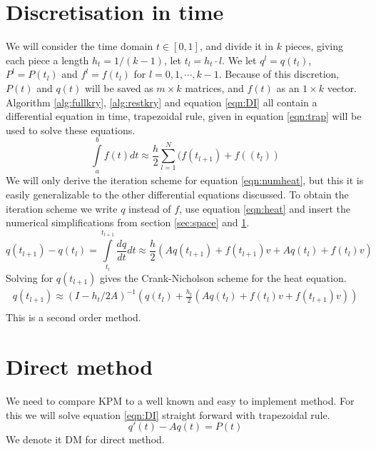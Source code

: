 \section{Discretisation in time} \label{sec:time}
We will consider the time domain $t \in [0,1] $, and divide it in $k$ pieces, giving each piece a length $h_t = 1/(k-1)$, let $t_l = h_t\cdot l$. We let $q^l=q(t_l)$, $P^l =P(t_l)$ and $f^l = f(t_l)$ for $l = 0,1,\cdots,k-1 $.
Because of this discretion, $P(t)$ and $q(t)$ will be saved as $m \times k $ matrices, and $f(t)$ as an $1 \times k$ vector.
Algorithm \ref{alg:fullkry}, \ref{alg:restkry} and equation \ref{eqn:DI} all contain a differential equation in time,
trapezoidal rule\cite{trap}, given in equation \eqref{eqn:trap} will be used to solve these equations. 
\begin{equation} \label{eqn:trap}
\int \limits_a^b f(t) dt \approx \frac{h}{2} \sum \limits_{l = 1}^N(f(t_{l+1})+f((t_l))
\end{equation}
We will only derive the iteration scheme for equation \eqref{eqn:numheat}, but 
this it is easily generalizable to the other differential equations discussed.
To obtain the iteration scheme we write $q$ instead of $f$, use equation \eqref{eqn:heat} and insert the numerical simplifications from section \ref{sec:space} and \ref{sec:time}.
\begin{equation}
q(t_{l+1}) - q(t_l) = \int \limits_{t_l}^{t_{l+1}} \frac{d q}{d t} dt \approx \frac{h}{2}(A q(t_{l+1})+f(t_{l+1})v +A q(t_l)+f(t_l) v) 
\end{equation}
Solving for $q(t_{l+1})$ gives the Crank-Nicholson scheme for the heat equation.
\begin{equation} \label{eqn:trapscheme}
\begin{aligned}
q(t_{l+1}) \approx (I-h_t/2 A)^{-1}(q(t_l) + \frac{h_t}{2}( A q(t_{l}) + f(t_l)v+f(t_{l+1})v))\\
\end{aligned}
\end{equation} 
This is a second order method.
\section{Direct method} \label{sec:DM}
We need to compare KPM to a well known and easy to implement method. For this we will solve equation \eqref{eqn:DI} straight forward with trapezoidal rule.
\begin{equation} \label{eqn:DI}
q'(t) -A q(t) = P(t)
\end{equation}
We denote it DM for direct method.

